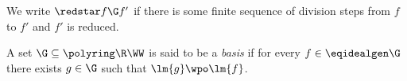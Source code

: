 We write $\redstar f \G f'$ if there is some finite sequence of division steps from $f$ to $f'$
and $f'$ is reduced.

A set $\G \subseteq \polyring \R \WW$ is said to be a \emph{\Gr basis} %
if for every $f \in \eqidealgen \G$ there exists %
$g \in \G$ such that $\lm{g} \wpo \lm{f}$.
%


